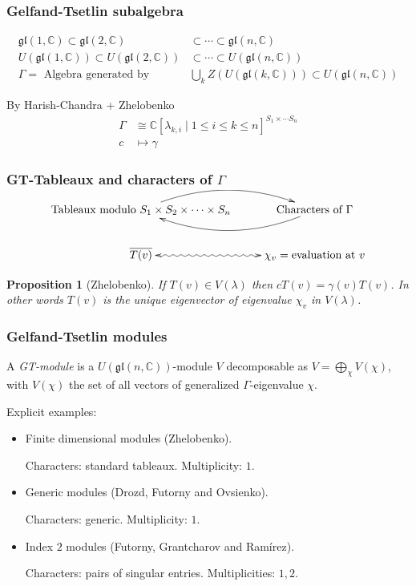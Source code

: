 \documentclass[smaller,usepdftitle=false]{beamer}
\newcommand\CC{\mathbb C}
\newcommand\gl{\mathfrak{gl}}
\newtheorem*{Proposition}{Proposition}
\begin{document}
\begin{frame}
\frametitle{Gelfand-Tsetlin subalgebra}

\begin{align*}
\gl(1,\CC) 
	\subset \gl(2,\CC) &\subset \cdots \subset \gl(n,\CC) \\
U(\gl(1,\CC)) 
	\subset U(\gl(2,\CC)) &\subset \cdots \subset U(\gl(n,\CC)) \\
\Gamma 
	= \mbox{ Algebra generated by } &\bigcup_k Z(U(\gl(k,\CC))) 
\subset U(\gl(n,\CC))
\end{align*}

\pause

By Harish-Chandra + Zhelobenko
\begin{align*}
\Gamma 
	&\cong \CC[\lambda_{k,i} \mid 1 \leq i \leq k 
		\leq n]^{S_1 \times \cdots S_n} \\
c &\longmapsto \gamma 
\end{align*}
\end{frame}

\begin{frame}
\frametitle{GT-Tableaux and characters of $\Gamma$}
\begin{align*}
\xymatrix{
	\mbox{Tableaux modulo } S_1 \times S_2 \times \cdots \times S_n
		\ar@/^18pt/[r] & \mbox{Characters of } \Gamma \ar@/^18pt/[l] \\
	\overline{T(v)} \ar@{<~>}[r]
		& \chi_v = \mbox{evaluation at } v
}
\end{align*}
\pause 
\begin{Proposition}[Zhelobenko]
If $T(v) \in V(\lambda)$ then $c T(v) = \gamma(v) T(v)$. In other words
$T(v)$ is the unique eigenvector of eigenvalue $\chi_v$ in $V(\lambda)$.
\end{Proposition}
\end{frame}

\begin{frame}
\frametitle{Gelfand-Tsetlin modules}
\begin{Definition}
A \emph{GT-module} is a $U(\gl(n,\CC))$-module $V$ decomposable as $V = 
\bigoplus_\chi V(\chi)$, with $V(\chi)$ the set of all vectors of
generalized $\Gamma$-eigenvalue $\chi$.
\end{Definition}
\pause

Explicit examples:
\begin{itemize}
\item Finite dimensional modules (Zhelobenko). 

Characters: standard tableaux. Multiplicity: $1$.

\item Generic modules (Drozd, Futorny and Ovsienko). 

Characters: generic. Multiplicity: $1$.

\item Index $2$ modules (Futorny, Grantcharov and Ramírez). 

Characters: pairs of singular entries. Multiplicities: $1, 2$.
\end{itemize}
\end{frame}
\end{document}
